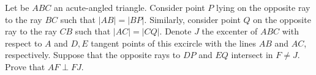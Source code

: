Let be $ABC$ an acute-angled triangle. Consider point $P$ lying on the opposite ray to the ray $BC$ such that $|AB|=|BP|$. Similarly, consider point $Q$ on the opposite ray to the ray $CB$ such that $|AC|=|CQ|$. Denote $J$ the excenter of $ABC$ with respect to $A$ and $D,E$ tangent points of this excircle with the lines $AB$ and $AC$, respectively. Suppose that the opposite rays to $DP$ and $EQ$ intersect in $F\neq J$. Prove that $AF\perp FJ$.